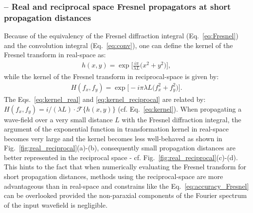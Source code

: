 \begin{refsection}
\subsubsection*{\normalsize -- Real and reciprocal space Fresnel propagators at short propagation distances }

Because of the equivalency of the Fresnel diffraction integral (Eq.~\ref{eq:Fresnel}) and the convolution integral (Eq.~\ref{eq:conv}), one can define the kernel of the Fresnel transform in real-space as:
\begin{align}\label{eq:kernel_real}
    h(x,y)=\exp\bigg[\frac{i\pi}{\lambda L}\big(x^2+y^2 \big)\bigg],
\end{align}{}
while the kernel of the Fresnel transform in reciprocal-space is given by:
\begin{align}\label{eq:kernel_reciprocal}
    H(f_x,f_y)=\exp{\bigg[-i\pi\lambda L\big(f_x^2+f_y^2 \big)\bigg]}.
\end{align}{}
The Eqs.~\ref{eq:kernel_real} and \ref{eq:kernel_reciprocal} are related by: $H(f_x,f_y)=i/(\lambda L)\cdot \mathcal{F}\{ h(x,y)\}$ (cf. Eq.~\ref{eq:kernel}). When propagating a wave-field over a very small distance $L$ with the Fresnel diffraction integral, the argument of the exponential function in transformation kernel in real-space becomes very large and the kernel becomes less well-behaved as shown in  Fig.~\ref{fig:real_reciprocal}(a)-(b), consequently small propagation distances are better represented in the reciprocal space - cf. Fig.~\ref{fig:real_reciprocal}(c)-(d). This hints to the fact that when numerically evaluating the Fresnel transform for short propagation distances, methods using the reciprocal-space are more advantageous than in real-space and constrains like the Eq.~\ref{eq:accuracy_Fresnel} can be overlooked provided the non-paraxial components of the Fourier spectrum of the input wavefield is negligible.


\end{refsection}

